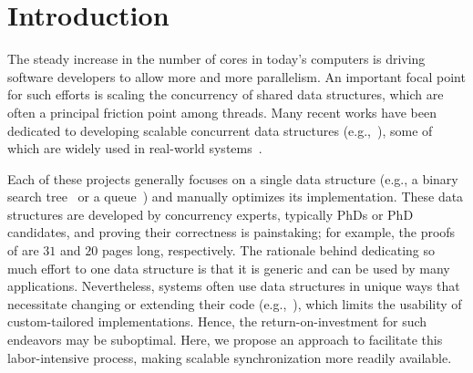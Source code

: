 
\section{Introduction} \label{sec:intro}

The steady increase in the number of cores in today's computers is driving software developers to allow more and more parallelism.
An important focal point for such efforts is scaling the concurrency of shared data structures, which are often a principal friction point among threads.
Many recent works have been dedicated to developing scalable concurrent data
structures (e.g.,~\cite{ArbelA2014,DrachslerVY2014,NatarajanM2014,BrownER2014,CrainGR2013,BraginskyP2012,
AfekKKMT2012,EllenFRB2010,BronsonCCO2010,HerlihyLLS2007,fraser2004practical,Michael:1996}),
some of which are widely used in real-world systems~\cite{Ohad:OOPSLA11}.

Each of these projects generally focuses on a single data
structure (e.g., a binary search tree~\cite{BronsonCCO2010} or a queue~\cite{Michael:1996}) and manually optimizes its implementation. These data structures are developed by concurrency experts, typically PhDs or PhD candidates, and
proving their correctness is painstaking;
for example, the proofs of \cite{BraginskyP2012,EllenFRB2010} are $31$ and $20$ pages long,
respectively.
The rationale behind dedicating so much effort to one data structure is that it is
generic and can be used by many applications. Nevertheless,  systems often use data structures in unique ways
that necessitate changing or extending their code (e.g.,~\cite{levelDB,jmonkey,OhadThesis,zyulkyarov2009atomic}), which limits the usability of custom-tailored
implementations. Hence, the return-on-investment for such endeavors may be suboptimal.
Here, we propose an approach to facilitate this labor-intensive process,
making scalable synchronization more readily available.

